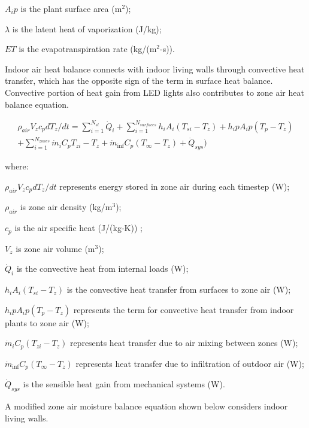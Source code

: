 \(A_ip\) is the plant surface area (m\(^2\));

\(\lambda\) is the latent heat of vaporization (J/kg);
 
\(ET\) is the evapotranspiration rate (kg/(m\(^2\)-s)).

Indoor air heat balance connects with indoor living walls through convective heat transfer, which has the opposite sign of the term in surface heat balance. Convective portion of heat gain from LED lights also contributes to zone air heat balance equation.

\begin{equation}
\begin{array}{l}{\rho_{air}}{V_z}{c_p}{dT_z}/{dt} = \sum\limits_{i = 1}^{{N_{sl}}} {\dot Q_i^{}}  + \sum\limits_{i = 1}^{{N_{surfaces}}} {{h_i}} {A_i} ({{T_{si}} - {T_z}}) + {{h_ip}}{A_ip}({{T_{p}} - {T_z}})\\ + \sum\limits_{i = 1}^{{N_{zones}}} {{{\dot m}_i}} {C_p}{{T_{zi}} - {T_z}} + {\dot m_{\inf }}{C_p}( {{T_\infty } - {T_z}}) +{\dot Q_{sys}})\end{array}
\end{equation} 

where:

\({\rho_{air}}{V_z}{c_p}{dT_z}/{dt}\) represents energy stored in zone air during each timestep (W);  

\({\rho_{air}}\) is zone air density (kg/m\(^3\));


\(c_p\) is the air specific heat (J/(kg-K)) ; 

\(V_z\) is zone air volume (m\(^3\));

\(\dot Q_i\) is the convective heat from internal loads (W); 

\({{h_i}} {A_i}\left( {{T_{si}} - {T_z}} \right)\) is the convective heat transfer from surfaces to zone air (W); 

\({{h_ip}} {A_ip}\left( {{T_{p}} - {T_z}} \right)\) represents the term for convective heat transfer from indoor plants to zone air (W);

\({{{\dot m}_i}} {C_p}\left( {{T_{zi}} - {T_z}} \right)\) represents heat transfer due to air mixing between zones (W);
 
\({\dot m_{\inf }}{C_p}\left( {{T_\infty } - {T_z}} \right)\) represents heat transfer due to infiltration of outdoor air (W); 

\(\dot Q_{sys}\) is the sensible heat gain from mechanical systems (W). 

A modified zone air moisture balance equation shown below considers indoor living walls.
    
